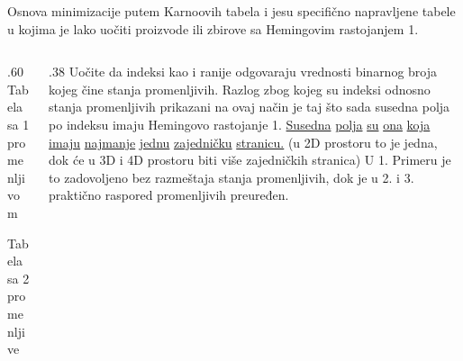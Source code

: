 \begin{frame}[label=02-s034]
\gusttekst
\alert{Osnova minimizacije putem Karnoovih tabela i jesu specifično napravljene tabele u kojima je lako uočiti proizvode ili zbirove sa Hemingovim rastojanjem 1.}

\begin{columns}[c,onlytextwidth]
\begin{column}{.60\textwidth}
Tabela sa 1 promenljivom



Tabela sa 2 promenljive


\end{column}
\begin{column}{.38\textwidth}
Uočite da indeksi kao i ranije odgovaraju vrednosti binarnog broja kojeg čine stanja promenljivih. Razlog zbog kojeg su indeksi odnosno stanja promenljivih prikazani na ovaj način je taj što sada susedna polja po indeksu imaju Hemingovo rastojanje 1. \alert{\underline{Susedna} \underline{polja} \underline{su} \underline{ona} \underline{koja} \underline{imaju} \underline{najmanje} \underline{jednu} \underline{zajedničku} \underline{stranicu.}} (u 2D prostoru to je jedna, dok će u 3D i 4D prostoru biti više zajedničkih stranica) U 1. Primeru je to zadovoljeno bez razmeštaja stanja promenljivih, dok je u 2. i 3. praktično raspored promenljivih preuređen.
\end{column}
\end{columns}
\end{frame}
